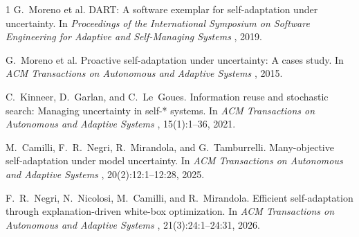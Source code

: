 \documentclass[oneside,openany,a4paper,12pt]{article}
\begin{document}

\begin{thebibliography}{1}
G.~Moreno et al.
\newblock DART: A software exemplar for self-adaptation under uncertainty.
\newblock In {\em Proceedings of the International Symposium on Software Engineering for Adaptive and Self-Managing Systems }, 2019.

G.~Moreno et al.
\newblock Proactive self-adaptation under uncertainty: A cases study.
\newblock In {\em ACM Transactions on Autonomous and Adaptive Systems }, 2015.

C.~Kinneer, D.~Garlan, and C.~Le~Goues.
\newblock Information reuse and stochastic search: Managing uncertainty in self-* systems.
\newblock In {\em ACM Transactions on Autonomous and Adaptive Systems }, 15(1):1--36, 2021.

M.~Camilli, F.~R.~Negri, R.~Mirandola, and G.~Tamburrelli.
\newblock Many-objective self-adaptation under model uncertainty.
\newblock In {\em ACM Transactions on Autonomous and Adaptive Systems }, 20(2):12:1--12:28, 2025.

F.~R.~Negri, N.~Nicolosi, M.~Camilli, and R.~Mirandola.
\newblock Efficient self-adaptation through explanation-driven white-box optimization.
\newblock In {\em ACM Transactions on Autonomous and Adaptive Systems }, 21(3):24:1--24:31, 2026.
\end{thebibliography}
\end{document}
